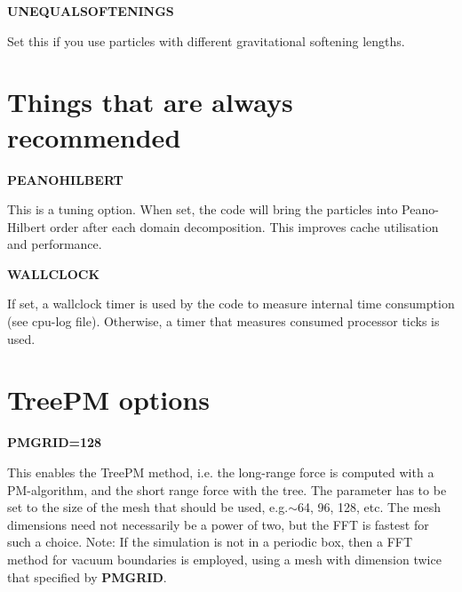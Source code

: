 \begin{DoxyItemize}
\item {\bfseries \-U\-N\-E\-Q\-U\-A\-L\-S\-O\-F\-T\-E\-N\-I\-N\-G\-S} \par
 \-Set this if you use particles with different gravitational softening lengths.
\end{DoxyItemize}

\par
 \hypertarget{Gadget-Makefile_secmake2}{}\section{\-Things that are always recommended}\label{Gadget-Makefile_secmake2}

\begin{DoxyItemize}
\item {\bfseries \-P\-E\-A\-N\-O\-H\-I\-L\-B\-E\-R\-T} \par
 \-This is a tuning option. \-When set, the code will bring the particles into \-Peano-\/\-Hilbert order after each domain decomposition. \-This improves cache utilisation and performance.
\end{DoxyItemize}


\begin{DoxyItemize}
\item {\bfseries \-W\-A\-L\-L\-C\-L\-O\-C\-K} \par
 \-If set, a wallclock timer is used by the code to measure internal time consumption (see cpu-\/log file). \-Otherwise, a timer that measures consumed processor ticks is used.
\end{DoxyItemize}

\par
 \hypertarget{Gadget-Makefile_secmake3}{}\section{\-Tree\-P\-M options}\label{Gadget-Makefile_secmake3}

\begin{DoxyItemize}
\item {\bfseries \-P\-M\-G\-R\-I\-D=128} \par
 \-This enables the \-Tree\-P\-M method, i.\-e. the long-\/range force is computed with a \-P\-M-\/algorithm, and the short range force with the tree. \-The parameter has to be set to the size of the mesh that should be used, e.\-g.$\sim$64, 96, 128, etc. \-The mesh dimensions need not necessarily be a power of two, but the \-F\-F\-T is fastest for such a choice. \-Note\-: \-If the simulation is not in a periodic box, then a \-F\-F\-T method for vacuum boundaries is employed, using a mesh with dimension twice that specified by {\bfseries \-P\-M\-G\-R\-I\-D}.
\end{DoxyItemize}



